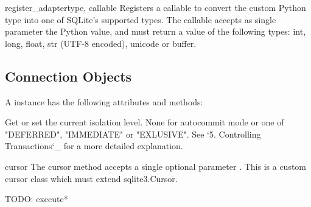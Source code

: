 \begin{funcdesc}{register_adapter}{type, callable}
Registers a callable to convert the custom Python type  into one of
SQLite's supported types. The callable  accepts as single
parameter the Python value, and must return a value of the following types:
int, long, float, str (UTF-8 encoded), unicode or buffer.
\end{funcdesc}






\subsection{Connection Objects \label{Connection-Objects}}

A  instance has the following attributes and methods:

    Get or set the current isolation level. None for autocommit mode or one
    of "DEFERRED", "IMMEDIATE" or "EXLUSIVE". See `5. Controlling
    Transactions`_ for a more detailed explanation.

\begin{methoddesc}{cursor}{}
    The cursor method accepts a single optional parameter .
    This is a custom cursor class which must extend sqlite3.Cursor.
\end{methoddesc}

TODO: execute*

